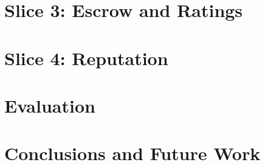 \documentclass[conference]{IEEEtran}
\begin{document}
\section{Slice 3: Escrow and Ratings}
\label{sec:slice3}


\section{Slice 4: Reputation}
\label{sec:slice4}


\section{Evaluation}
\label{sec:eval}


\section{Conclusions and Future Work}
\label{sec:concl}



\end{document}

